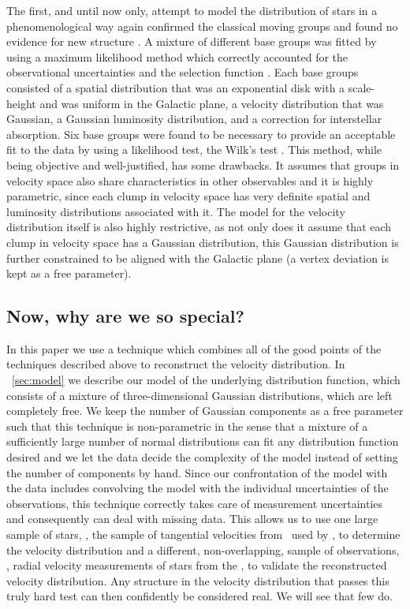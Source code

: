 The first, and until now only, attempt to model the distribution of
stars in a phenomenological way again confirmed the classical moving
groups and found no evidence for new structure
\citep{2005A&A...430..165F}. A mixture of different base groups was
fitted by using a maximum likelihood method which correctly accounted
for the observational uncertainties and the selection function
\citep{1996A&AS..117..405L}. Each base groups consisted of a spatial
distribution that was an exponential disk with a scale-height and was
uniform in the Galactic plane, a velocity distribution that was
Gaussian, a Gaussian luminosity distribution, and a correction for
interstellar absorption. Six base groups were found to be necessary to
provide an acceptable fit to the data by using a likelihood test, the
Wilk's test \citep{1990ebua.conf..407S}. This method, while being
objective and well-justified, has some drawbacks. It assumes that
groups in velocity space also share characteristics in other
observables and it is highly parametric, since each clump in velocity
space has very definite spatial and luminosity distributions
associated with it. The model for the velocity distribution itself is
also highly restrictive, as not only does it assume that each clump in
velocity space has a Gaussian distribution, this Gaussian distribution
is further constrained to be aligned with the Galactic plane (a vertex
deviation is kept as a free parameter).



\subsection{Now, why are we so special?}

In this paper we use a technique which combines all of the good points
of the techniques described above to reconstruct the velocity
distribution. In \sectionname\ \ref{sec:model} we describe our model
of the underlying distribution function, which consists of a mixture
of three-dimensional Gaussian distributions, which are left completely
free. We keep the number of Gaussian components as a free parameter
such that this technique is non-parametric in the sense that a mixture
of a sufficiently large number of normal distributions can fit any
distribution function desired and we let the data decide the
complexity of the model instead of setting the number of components by
hand. Since our confrontation of the model with the data includes
convolving the model with the individual uncertainties of the
observations, this technique correctly takes care of measurement
uncertainties and consequently can deal with missing data. This allows
us to use one large sample of stars, \ie, the sample of tangential
velocities from \Hipparcos\ used by \citet{1998AJ....115.2384D}, to
determine the velocity distribution and a different, non-overlapping,
sample of observations, \ie, radial velocity measurements of stars
from the \gcs, to validate the reconstructed velocity
distribution. Any structure in the velocity distribution that passes
this truly hard test can then confidently be considered real. We will
see that few do.


